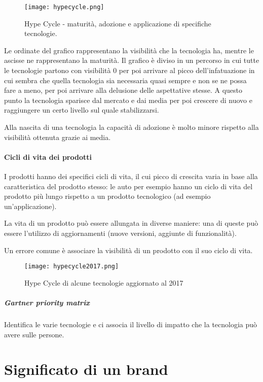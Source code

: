 \begin{figure}[H]
\centering
\texttt{[image: hypecycle.png]}
\caption{Hype Cycle - maturità, adozione e applicazione di specifiche
tecnologie.}
\label{fig:hypecycle}
\end{figure}

Le ordinate del grafico rappresentano la visibilità che la tecnologia ha,
mentre le ascisse ne rappresentano la maturità.
Il grafico è diviso in un percorso in cui tutte le tecnologie partono con
visibilità 0 per poi arrivare al picco dell'infatuazione in cui sembra che
quella tecnologia sia necessaria quasi sempre e non se ne possa fare a meno,
per poi arrivare alla delusione delle aspettative stesse.
A questo punto la tecnologia sparisce dal mercato e dai media per poi crescere
di nuovo e raggiungere un certo livello sul quale stabilizzarsi.

Alla nascita di una tecnologia la capacità di adozione è molto minore rispetto
alla visibilità ottenuta grazie ai media.

\paragraph*{Cicli di vita dei prodotti} I prodotti hanno dei specifici cicli di
vita, il cui picco di crescita varia in base alla caratteristica del prodotto
stesso: le auto per esempio hanno un ciclo di vita del prodotto più lungo
rispetto a un prodotto tecnologico (ad esempio un'applicazione).

La vita di un prodotto può essere allungata in diverse maniere:
una di queste può essere l'utilizzo di aggiornamenti (nuove versioni,
aggiunte di funzionalità).

Un errore comune è associare la visibilità di un prodotto con il suo ciclo di
vita.

\begin{figure}[H]
\centering
\texttt{[image: hypecycle2017.png]}
\caption{Hype Cycle di alcune tecnologie aggiornato al 2017}
\label{fig:hypecycle}
\end{figure}

\subparagraph*{Gartner priority matrix} Identifica le varie tecnologie e ci
associa il livello di impatto che la tecnologia può avere sulle persone.

\section{Significato di un brand}

